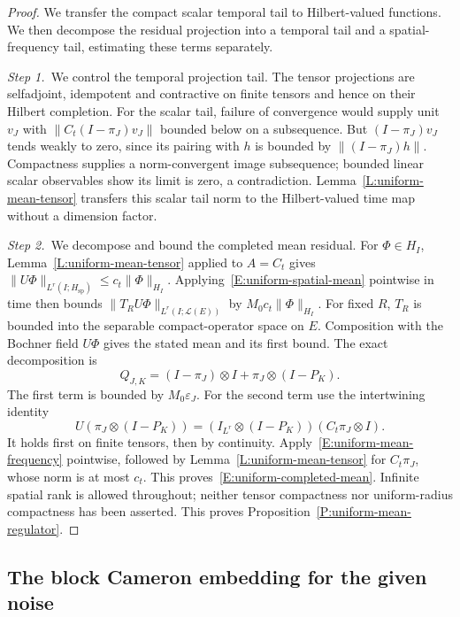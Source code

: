 \begin{proof}
  We transfer the compact scalar temporal tail to Hilbert-valued functions. We
  then decompose the residual projection into a temporal tail and a
  spatial-frequency tail, estimating these terms separately.


  \medskip
  \noindent\textit{Step 1.~}We control the temporal projection tail.
  The tensor projections are selfadjoint, idempotent and contractive on finite
  tensors and hence on their Hilbert completion. For the scalar tail, failure of
  convergence would supply unit $v_J$ with $\|C_t(I-\pi_J)v_J\|$ bounded below
  on a subsequence. But $(I-\pi_J)v_J$ tends weakly to zero, since its pairing
  with $h$ is bounded by $\|(I-\pi_J)h\|$. Compactness supplies a
  norm-convergent image subsequence; bounded linear scalar observables show its
  limit is zero, a contradiction. Lemma~\ref{L:uniform-mean-tensor} transfers
  this scalar tail norm to the Hilbert-valued time map without a dimension
  factor.


  \medskip
  \noindent\textit{Step 2.~}We decompose and bound the completed mean
  residual.
  For $\Phi\in H_I$, Lemma~\ref{L:uniform-mean-tensor} applied to $A=C_t$
  gives $\|U\Phi\|_{L^r(I;H_{\mathrm{sp}})}\le c_t\|\Phi\|_{H_I}$.
  Applying~\eqref{E:uniform-spatial-mean} pointwise in time then bounds
  $\|T_RU\Phi\|_{L^r(I;\mathcal{L}(E))}$ by $M_0c_t\|\Phi\|_{H_I}$.
  For fixed $R$, $T_R$ is bounded into the separable compact-operator space on
  $E$. Composition with the Bochner field $U\Phi$ gives the stated mean and its
  first bound. The exact decomposition is
  \[
    Q_{J,K}=(I-\pi_J)\otimes I+\pi_J\otimes(I-P_K).
  \]
  The first term is bounded by $M_0\varepsilon_J$. For the second term use the
  intertwining identity
  \[
    U(\pi_J\otimes(I-P_K))
    =(I_{L^r}\otimes(I-P_K))(C_t\pi_J\otimes I).
  \]
  It holds first on finite tensors, then by continuity.
  Apply~\eqref{E:uniform-mean-frequency} pointwise, followed by
  Lemma~\ref{L:uniform-mean-tensor} for $C_t\pi_J$, whose norm is at most $c_t$.
  This proves~\eqref{E:uniform-completed-mean}. Infinite spatial rank is allowed
  throughout; neither tensor compactness nor uniform-radius compactness has been
  asserted. This proves Proposition~\ref{P:uniform-mean-regulator}.
\end{proof}

\subsection{The block Cameron embedding for the given noise}

